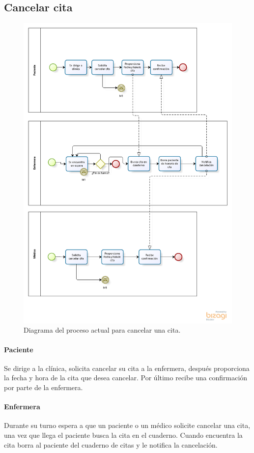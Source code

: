 \subsection{Cancelar cita}
\begin{figure}[htbp!]
	\centering
	\includegraphics[width=\textwidth]{images/procesos/cancelar_cita_old}
	\caption{Diagrama del proceso actual para cancelar una cita.}
\end{figure}
\paragraph{Paciente}
Se dirige a la clínica, solicita cancelar su cita a la enfermera, después proporciona la fecha y hora de la cita que desea cancelar. Por último recibe una confirmación por parte de la enfermera.
\paragraph{Enfermera}
Durante su turno espera a que un paciente o un médico solicite cancelar una cita, una vez que llega el paciente busca la cita en el cuaderno. Cuando encuentra la cita borra al paciente del cuaderno de citas y le notifica la cancelación.
